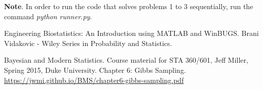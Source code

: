 \documentclass[a4 paper]{article}
\begin{document}
\textbf{Note}. In order to run the code
that solves problems 1 to 3 
sequentially, run the 
command \textit{python runner.py}.
 




\begin{thebibliography}{9}


\label{stat} 
Engineering Biostatistics: An Introduction using MATLAB and WinBUGS. 
Brani Vidakovic - Wiley Series in Probability and Statistics.


\label{miller} 
Bayesian and Modern Statistics. Course material for STA 360/601,
Jeff Miller, Spring 2015, Duke University. Chapter 6: Gibbs Sampling.
\url{https://jwmi.github.io/BMS/chapter6-gibbs-sampling.pdf}

\end{thebibliography}
\end{document}
